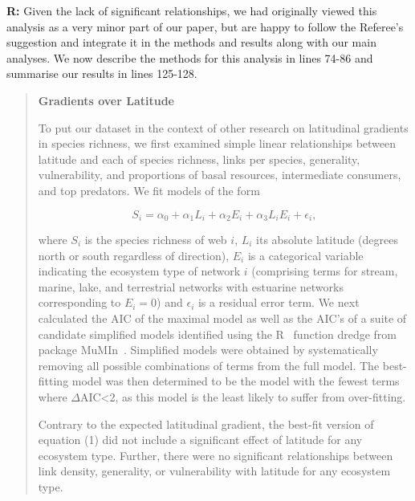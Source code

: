 \documentclass[12pt]{letter}
\begin{document}
  \textbf{R:} Given the lack of significant relationships,
  we had originally viewed this analysis as a very minor 
  part of our paper, but are happy to follow the Referee's 
  suggestion and integrate it in the methods and
  results along with our main analyses. We now describe 
  the methods for this analysis in lines 74-86 and 
  summarise our results in lines 125-128.


  \begin{quotation}

    \textbf{Gradients over Latitude}

    To put our dataset in the context of other research on latitudinal gradients in species richness,
    we first examined simple linear relationships between latitude and each of 
    species richness, links per species, generality, vulnerability, and proportions
    of basal resources, intermediate consumers, and top predators. We fit models of the form

    \begin{equation}
    \label{Latfull}
    S_{i} = \alpha_{0} + \alpha_{1} L_{i} + \alpha_{2} E_{i} + \alpha_{3} L_{i} E_{i} + \epsilon_{i} ,
    \end{equation}

    \noindent where $S_{i}$ is the species richness of web $i$, $L_{i}$ its absolute
    latitude (degrees north or south  regardless of direction), $E_{i}$ is a categorical
    variable indicating the ecosystem type of network $i$ (comprising terms for stream, 
    marine, lake, and terrestrial networks with estuarine
    networks corresponding to $E_{i}=0$) and $\epsilon_{i}$ is a residual error term. 
    We next calculated the AIC
    of the maximal model as well as the AIC's of a suite of candidate simplified models identified
    using the R~\cite{R} function dredge from package MuMIn~\cite{MuMIn}. 
    Simplified models were obtained by
    systematically removing all possible combinations of terms from the full model.
    The best-fitting model was then determined to be the model with the fewest terms 
    where $\Delta$AIC\textless2, as this model is the least likely to suffer from over-fitting. 


    \smallskip

    Contrary to the expected latitudinal gradient, the 
    best-fit version of equation (1) did not include a 
    significant effect of latitude for any ecosystem type. 
    Further, there were no significant relationships 
    between link density, generality, or vulnerability with
    latitude for any ecosystem type.

  \end{quotation}
\end{document}
